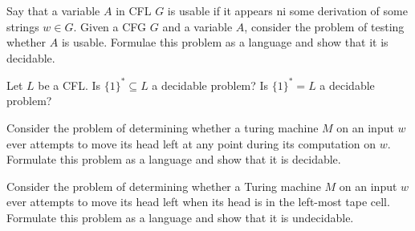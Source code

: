 \documentclass[12pt]{exam}
\begin{document}
\begin{questions}
  \question{}
  Say that a variable $A$ in CFL $G$ is usable if it appears ni some derivation of some strings $w\in G$. Given a CFG $G$ and a variable $A$, consider the problem of testing whether $A$ is usable.
  Formulae this problem as a language and show that it is decidable.


  \question{}
  Let $L$ be a CFL. Is $\{1\}^{*}\subseteq L$ a decidable problem?
  Is $\{1\}^{*}=L$ a decidable problem?

  \question{}
  Consider the problem of determining whether a turing machine $M$ on an input $w$ ever attempts to move its head left at any point during its computation on $w$. Formulate this problem as a language and show that it is decidable.


  \question{}
  Consider the problem of determining whether a Turing machine $M$ on an input $w$ ever
  attempts to move its head left when its head is in the left-most tape cell.
  Formulate this problem as a language and show that it is undecidable.

\end{questions}
\end{document}

